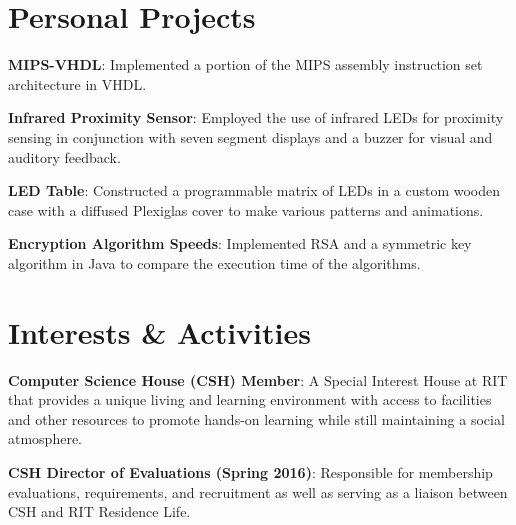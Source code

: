 \documentclass[a4paper,margin,line]{resume}
\begin{document}
\begin{resume}
\section{\mysidestyle Personal Projects}
    \begin{asparablank}
        \item \textbf{MIPS-VHDL}: Implemented a portion of the MIPS assembly instruction set 
            architecture in VHDL.\\
        \item \textbf{Infrared Proximity Sensor}: Employed the use of infrared LEDs for proximity 
            sensing in conjunction with seven segment displays and a buzzer for visual and auditory 
            feedback.\\
        \item \textbf{LED Table}: Constructed a programmable matrix of LEDs in a custom wooden 
            case with a diffused Plexiglas cover to make various patterns and animations.\\
        \item \textbf{Encryption Algorithm Speeds}: Implemented RSA and a symmetric key algorithm 
            in Java to compare the execution time of the algorithms.
    \end{asparablank}
\section{\mysidestyle Interests \& Activities}
    \begin{asparablank}
        \item \textbf{Computer Science House (CSH) Member}: A Special Interest House at RIT that
            provides a unique living and learning environment with access to facilities and other resources to promote
            hands-on learning while still maintaining a social atmosphere.\\
        \item \textbf{CSH Director of Evaluations (Spring 2016)}: Responsible for membership evaluations, requirements, and recruitment 
            as well as serving as a liaison between CSH and RIT Residence Life.
    \end{asparablank}
\end{resume}
\end{document}
